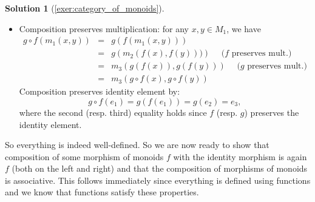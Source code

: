 \documentclass[a4paper,11pt, oneside,titlepage=false]{scrbook}
\theoremstyle{plain}
\theoremstyle{definition}
\newtheorem{solution}[thm]{Solution}
\newcommand{\co}[2]{\ensuremath{#2 \circ #1}}
\begin{document}
\begin{solution}[\cref{exer:category_of_monoids}]
\begin{itemize}
\begin{itemize}
\item Composition preserves multiplication: for any $x,y \in M_1$, we have
\begin{eqnarray*}
 \co{f}{g}(m_1(x,y)) &=& g\left(f(m_1(x,y))\right)\\
	&=& g\left(m_2(f(x),f(y)))\right) \quad \text{ ($f$ preserves mult.)} \\
	&=& m_3(g(f(x)),g(f(y))) \quad \text{ ($g$ preserves mult.)}\\
	&=& m_3(\co{f}{g}(x),\co{f}{g}(y))
\end{eqnarray*}
Composition preserves identity element by:
\[
\co{f}{g}(e_1) = g(f(e_1)) = g(e_2) = e_3,
\]
where the second (resp. third) equality holds since $f$ (resp. $g$) preserves the identity element.
\end{itemize}
\end{itemize}
So everything is indeed well-defined. So we are now ready to show that composition of some morphism of monoids $f$ with the identity morphism is again $f$ (both on the left and right) and that the composition of morphisms of monoids is associative. This follows immediately since everything is defined using functions and we know that functions satisfy these properties.
\end{solution}
\end{document}

